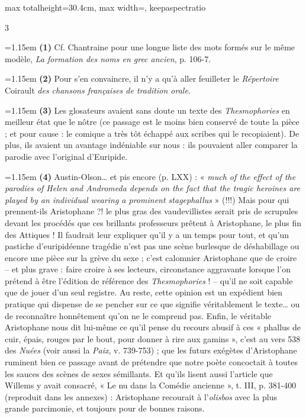 \documentclass[11pt,twoside]{book}
\newcommand{\italique}[1]{\textit{#1}}
\newcommand{\anglais}[1]{\textit{#1}}
\begin{document}
\begin{adjustbox}{max totalheight=30.4cm, max width=\textwidth, keepaspectratio}
\begin{minipage}{\textwidth}
{\begin{multicols}{3}
\par\vspace{1.5pt}
\noindent\hangindent=1.15em {\color{sepiaNote}\textbf{(1)}} Cf. Chantraine pour une longue liste des mots formés sur le même modèle, \italique{La formation des noms en grec ancien}, p. 106-7.
\par\vspace{1.5pt}
\noindent\hangindent=1.15em {\color{sepiaNote}\textbf{(2)}} Pour s'en convaincre, il n'y a qu'à aller feuilleter le \italique{Répertoire} Coirault \italique{des chansons françaises de tradition orale}.
\par\vspace{1.5pt}
\noindent\hangindent=1.15em {\color{sepiaNote}\textbf{(3)}} Les glosateurs avaient sans doute un texte des \italique{Thesmophories} en meilleur état que le nôtre (ce passage est le moins bien conservé de toute la pièce ; et pour cause : le comique a très tôt échappé aux scribes qui le recopiaient). De plus, ils avaient un avantage indéniable sur nous : ils pouvaient aller comparer la parodie avec l'original d'Euripide.
\par\vspace{1.5pt}
\noindent\hangindent=1.15em {\color{sepiaNote}\textbf{(4)}} Austin-Olson… et pis encore (p. LXX) : « \anglais{much of the effect of the parodies of Helen and Andromeda depends on the fact that the tragic heroines are played by an individual wearing a prominent stagephallus} » (!!!) Mais pour qui prennent-ils Aristophane ?! le plus gras des vaudevillistes serait pris de scrupules devant les procédés que ces brillants professeurs prêtent à Aristophane, le plus fin des Attiques ! Il faudrait leur expliquer qu'il y a un temps pour tout, et qu'un pastiche d'euripidéenne tragédie n'est pas une scène burlesque de déshabillage ou encore une pièce sur la grève du sexe ; c'est calomnier Aristophane que de croire – et plus grave : faire croire à ses lecteurs, circonstance aggravante lorsque l'on prétend à être l'édition de référence des \italique{Thesmophories} ! – qu'il ne soit capable que de jouer d'un seul registre. Au reste, cette opinion est un expédient bien pratique qui dispense de se pencher sur ce que signifie véritablement le texte… ou de reconnaître honnêtement qu'on ne le comprend pas. Enfin, le véritable Aristophane nous dit lui-même ce qu'il pense du recours abusif à ces « phallus de cuir, épais, rouges par le bout, pour donner à rire aux gamins », c'est au vers 538 des \italique{Nuées} (voir aussi la \italique{Paix}, v. 739-753) ; que les futurs exégètes d'Aristophane ruminent bien ce passage avant de prétendre que notre poète concoctait à toutes les sauces des scènes de sexes sémillants. Et qu'ils lisent aussi l'article que Willems y avait consacré, « Le nu dans la Comédie ancienne », t. III, p. 381-400 (reproduit dans les annexes) : Aristophane recourait à l'\italique{olisbos} avec la plus grande parcimonie, et toujours pour de bonnes raisons.

\end{multicols}}
\end{minipage}
\end{adjustbox}
\end{document}
